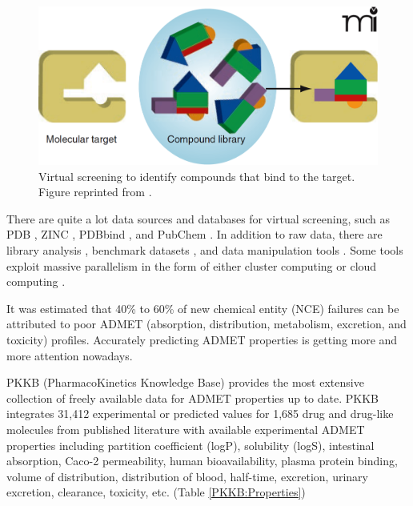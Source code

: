 \begin{figure}
\centering
\includegraphics[width=\textwidth]{Background/VirtualScreening.png}
\caption{Virtual screening to identify compounds that bind to the target. Figure reprinted from \citep{470}.}
\label{Background:VirtualScreening}
\end{figure}

There are quite a lot data sources and databases for virtual screening, such as PDB \citep{540,537}, ZINC \citep{532,1178}, PDBbind \citep{529,530}, and PubChem \citep{526}. In addition to raw data, there are library analysis \citep{521}, benchmark datasets \citep{534,533,535,536}, and data manipulation tools \citep{542}. Some tools exploit massive parallelism in the form of either cluster computing or cloud computing \citep{557,773,560,782}.




It was estimated that 40\% to 60\% of new chemical entity (NCE) failures can be attributed to poor ADMET (absorption, distribution, metabolism, excretion, and toxicity) profiles. Accurately predicting ADMET properties is getting more and more attention nowadays.

PKKB (PharmacoKinetics Knowledge Base) \citep{1133} provides the most extensive collection of freely available data for ADMET properties up to date. PKKB integrates 31,412 experimental or predicted values for 1,685 drug and drug-like molecules from published literature with available experimental ADMET properties including partition coefficient (logP), solubility (logS), intestinal absorption, Caco-2 permeability, human bioavailability, plasma protein binding, volume of distribution, distribution of blood, half-time, excretion, urinary excretion, clearance, toxicity, etc. (Table \ref{PKKB:Properties})

